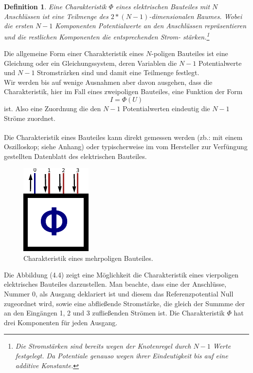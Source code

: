 \documentclass[11pt,a4paper,leqno]{report}
\newtheorem{definition}[theorem]{Definition}
\numberwithin{equation}{chapter}
\begin{document}
\begin{definition}
	Eine Charakteristik $\Phi$ eines elektrischen Bauteiles mit $N$ Anschl\"ussen ist eine Teilmenge des $2 * (N - 1)$-dimensionalen Raumes. Wobei die ersten $N - 1$ Komponenten Potentialwerte an den Anschl\"ussen repr\"asentieren und die restlichen Komponenten die entsprechenden Strom- st\"arken.\footnote{Die Stromst\"arken sind bereits wegen der Knotenregel durch $N - 1$ Werte  festgelegt. Da Potentiale genauso wegen ihrer Eindeutigkeit bis auf eine additive Konstante.}
\end{definition}
\noindent
Die allgemeine Form einer Charakteristik eines $N$-poligen Bauteiles ist eine Gleichung oder ein Gleichungssystem, deren Variablen die $N-1$ Potentialwerte und $N-1$ Stromstr\"arken sind und damit eine Teilmenge festlegt. \\Wir werden bis auf wenige Ausnahmen aber davon ausgehen, dass die Charakteristik, hier im Fall eines zweipoligen Bauteiles, eine Funktion der Form
\begin{equation*}
	I = \Phi(U)
\end{equation*}
ist. Also eine Zuordnung die den $N-1$ Potentialwerten eindeutig die $N-1$ Str\"ome zuordnet. \\
\\
Die Charakteristik eines Bauteiles kann direkt gemessen werden (zb.: mit einem Oszilloskop; siehe Anhang) oder typischerweise im vom Hersteller zur Verf\"ungung gestellten Datenblatt des elektrischen Bauteiles.
\begin{figure}[H]
	\begin{center}
		\includegraphics[scale=1]{charakter.pdf}
	\end{center}
	\caption{Charakteristik eines mehrpoligen Bauteiles.}
\end{figure}
\noindent
Die Abbildung (4.4) zeigt eine M\"oglichkeit die Charakteristik eines vierpoligen elektrisches Bauteiles darzustellen. Man beachte, dass eine der Anschl\"usse, Nummer 0, als Ausgang deklariert ist und diesem das Referenzpotential Null zugeordnet wird, sowie eine abflie\ss{}ende Stromst\"arke, die gleich der Summme der an den Eing\"angen 1, 2 und 3 zuflie\ss{}enden Str\"omen ist. Die Charakteristik $\Phi$ hat drei Komponenten f\"ur jeden Ausgang.
\end{document}
